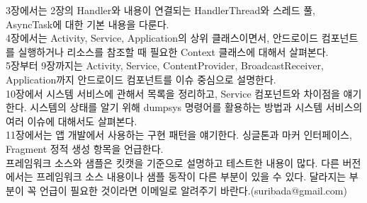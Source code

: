 \documentclass[a4paper,hidelinks,10pt,openany]{book} %
\begin{document}
3장에서는 2장의 Handler와 내용이 연결되는 HandlerThread와 스레드 풀, AsyncTask에 대한 기본 내용을 다룬다.\\

4장에서는 Activity, Service, Application의 상위 클래스이면서, 안드로이드 컴포넌트를 실행하거나 리소스를 참조할 때 필요한 Context 클래스에 대해서 살펴본다.\\

5장부터 9장까지는 Activity, Service, ContentProvider, BroadcastReceiver, Application까지 안드로이드 컴포넌트를 이슈 중심으로 설명한다.\\

10장에서 시스템 서비스에 관해서 목록을 정리하고, Service 컴포넌트와 차이점을 얘기한다. 시스템의 상태를 알기 위해 dumpsys 명령어를 활용하는 방법과 시스템 서비스의 여러 이슈에 대해서도 살펴본다.\\

11장에서는 앱 개발에서 사용하는 구현 패턴을 얘기한다. 싱글톤과 마커 인터페이스, Fragment 정적 생성 항목을 언급한다.\\

프레임워크 소스와 샘플은 킷캣을 기준으로 설명하고 테스트한 내용이 많다. 다른 버전에서는 프레임워크 소스 내용이나 샘플 동작이 다른 부분이 있을 수 있다. 달라지는 부분이 꼭 언급이 필요한 것이라면 이메일로 알려주기 바란다.(suribada@gmail.com)









%









\ 
%

%
%




\end{document}
